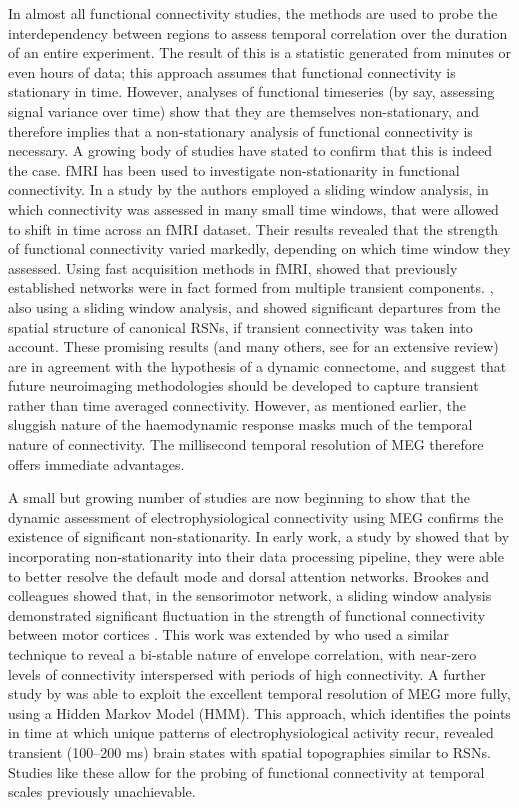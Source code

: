 In almost all functional connectivity studies, the methods are used to probe the interdependency between regions to assess temporal correlation over the duration of an entire experiment. The result of this is a statistic generated from minutes or even hours of data; this approach assumes that functional connectivity is stationary in time. However, analyses of functional timeseries (by say, assessing signal variance over time) show that they are themselves non-stationary, and therefore implies that a non-stationary analysis of functional connectivity is necessary. A growing body of studies have stated to confirm that this is indeed the case. fMRI has been used to investigate non-stationarity in functional connectivity. In a study by \cite{Chang2010} the authors employed a sliding window analysis, in which connectivity was assessed in many small time windows, that were allowed to shift in time across an fMRI dataset. Their results revealed that the strength of functional connectivity varied markedly, depending on which time window they assessed. Using fast acquisition methods in fMRI, \cite{Smith2012} showed that previously established networks were in fact formed from multiple transient components. \cite{Allen2014}, also using a sliding window analysis, and showed significant departures from the spatial structure of canonical RSNs, if transient connectivity was taken into account. These promising results (and many others, see \citealp{Hutchinson2013} for an extensive review) are in agreement with the hypothesis of a dynamic connectome, and suggest that future neuroimaging methodologies should be developed to capture transient rather than time averaged connectivity. However, as mentioned earlier, the sluggish nature of the haemodynamic response masks much of the temporal nature of connectivity. The millisecond temporal resolution of MEG therefore offers immediate advantages.

A small but growing number of studies are now beginning to show that the dynamic assessment of electrophysiological connectivity using MEG confirms the existence of significant non-stationarity. In early work, a study by \cite{dePasquale2010} showed that by incorporating non-stationarity into their data processing pipeline, they were able to better resolve the default mode and dorsal attention networks. Brookes and colleagues showed that, in the sensorimotor network, a sliding window analysis demonstrated significant fluctuation in the strength of functional connectivity between motor cortices \citep{Brookes2011a}. This work
was extended by \cite{Baker2012} who used a similar technique to reveal a bi-stable nature of envelope correlation, with near-zero levels of connectivity interspersed with periods of high connectivity. A further study by \citep{Baker2014} was able to exploit the excellent temporal resolution of MEG more fully, using a Hidden Markov Model (HMM). This approach, which identifies the points in time at which unique patterns of electrophysiological activity recur, revealed transient (100–200 ms) brain states with spatial topographies similar to RSNs. Studies like these allow for the probing of functional connectivity at temporal scales previously unachievable. 

